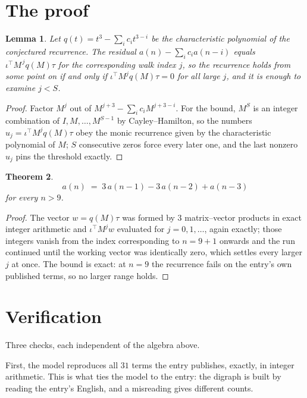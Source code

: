 \documentclass[11pt,a4paper]{article}
\theoremstyle{plain}
\newtheorem{theorem}{Theorem}
\newtheorem{lemma}[theorem]{Lemma}
\theoremstyle{definition}
\begin{document}
\section{The proof}

\begin{lemma}\label{lem:crit}
Let $q(t)=t^{3}-\sum_i c_it^{3-i}$ be the characteristic polynomial of the
conjectured recurrence. The residual $a(n)-\sum_ic_ia(n-i)$ equals
$\iota^{\!\top}M^{\,j}q(M)\tau$ for the corresponding walk index $j$, so the recurrence
holds from some point on if and only if $\iota^{\!\top}M^{j}q(M)\tau=0$ for all large $j$,
and it is enough to examine $j<S$.
\end{lemma}

\begin{proof}
Factor $M^{j}$ out of $M^{j+3}-\sum_ic_iM^{j+3-i}$. For the bound, $M^{S}$
is an integer combination of $I,M,\dots,M^{S-1}$ by Cayley--Hamilton, so the numbers
$u_j=\iota^{\!\top}M^{j}q(M)\tau$ obey the monic recurrence given by the characteristic
polynomial of $M$; $S$ consecutive zeros force every later one, and the last nonzero $u_j$
pins the threshold exactly.
\end{proof}

\begin{theorem}
\[
a(n)\;=\;3\,a(n-1) - 3\,a(n-2) + a(n-3)
\]
for every $n>9$.
\end{theorem}

\begin{proof}
The vector $w=q(M)\tau$ was formed by $3$ matrix--vector products in exact integer
arithmetic and $\iota^{\!\top}M^{j}w$ evaluated for $j=0,1,\dots$, again exactly; those
integers vanish from the index corresponding to $n=9+1$ onwards and the run continued
until the working vector was identically zero, which settles every larger $j$ at once. The bound is exact: at $n=9$ the recurrence fails on the entry's own published terms, so no larger range holds.
\end{proof}

\section{Verification}

Three checks, each independent of the algebra above.

First, the model reproduces all $31$ terms the entry publishes, exactly, in integer
arithmetic. This is what ties the model to the entry: the digraph is built by reading the
entry's English, and a misreading gives different counts.
\end{document}
